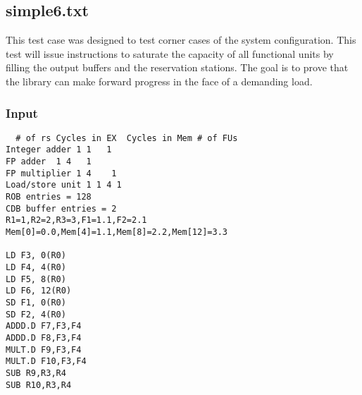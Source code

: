 \documentclass[12pt]{article}
\begin{document}
\subsection{simple6.txt}
This test case was designed to test corner cases of the system configuration.  This test will issue instructions to saturate the capacity of all functional units by filling the output buffers and the reservation stations.  The goal is to prove that the library can make forward progress in the face of a demanding load.

\subsubsection*{Input}
\begin{verbatim}
  # of rs Cycles in EX  Cycles in Mem # of FUs
Integer adder 1 1   1
FP adder  1 4   1
FP multiplier 1 4    1
Load/store unit 1 1 4 1
ROB entries = 128
CDB buffer entries = 2
R1=1,R2=2,R3=3,F1=1.1,F2=2.1
Mem[0]=0.0,Mem[4]=1.1,Mem[8]=2.2,Mem[12]=3.3

LD F3, 0(R0)
LD F4, 4(R0)
LD F5, 8(R0)
LD F6, 12(R0)
SD F1, 0(R0)
SD F2, 4(R0)
ADDD.D F7,F3,F4
ADDD.D F8,F3,F4
MULT.D F9,F3,F4
MULT.D F10,F3,F4
SUB R9,R3,R4
SUB R10,R3,R4

\end{verbatim}
\end{document}
